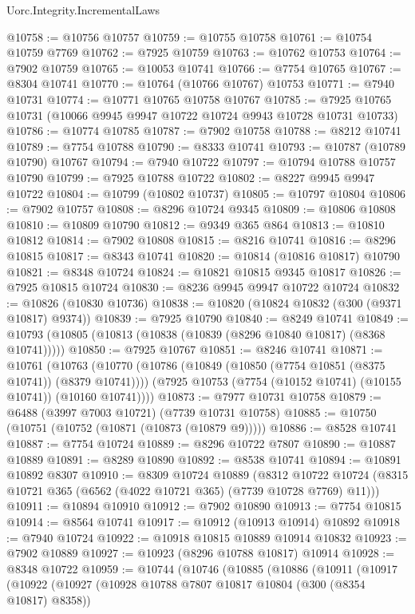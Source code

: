 \begin{lexlean}{Uorc.Integrity.IncrementalLaws}
\begin{coremodule}
@10758 := @10756 @10757
@10759 := @10755 @10758
@10761 := @10754 @10759 @7769
@10762 := @7925 @10759
@10763 := @10762 @10753
@10764 := @7902 @10759
@10765 := @10053 @10741
@10766 := @7754 @10765
@10767 := @8304 @10741
@10770 := @10764 (@10766 @10767) @10753
@10771 := @7940 @10731
@10774 := @10771 @10765 @10758 @10767
@10785 := @7925 @10765 @10731 (@10066 @9945 @9947 @10722 @10724 @9943 @10728 @10731 @10733)
@10786 := @10774 @10785
@10787 := @7902 @10758
@10788 := @8212 @10741
@10789 := @7754 @10788
@10790 := @8333 @10741
@10793 := @10787 (@10789 @10790) @10767
@10794 := @7940 @10722
@10797 := @10794 @10788 @10757 @10790
@10799 := @7925 @10788 @10722
@10802 := @8227 @9945 @9947 @10722
@10804 := @10799 (@10802 @10737)
@10805 := @10797 @10804
@10806 := @7902 @10757
@10808 := @8296 @10724 @9345
@10809 := @10806 @10808
@10810 := @10809 @10790
@10812 := @9349 @365 @864
@10813 := @10810 @10812
@10814 := @7902 @10808
@10815 := @8216 @10741
@10816 := @8296 @10815
@10817 := @8343 @10741
@10820 := @10814 (@10816 @10817) @10790
@10821 := @8348 @10724
@10824 := @10821 @10815 @9345 @10817
@10826 := @7925 @10815 @10724
@10830 := @8236 @9945 @9947 @10722 @10724
@10832 := @10826 (@10830 @10736)
@10838 := @10820 (@10824 @10832 (@300 (@9371 @10817) @9374))
@10839 := @7925 @10790
@10840 := @8249 @10741
@10849 := @10793 (@10805 (@10813 (@10838 (@10839 (@8296 @10840 @10817) (@8368 @10741)))))
@10850 := @7925 @10767
@10851 := @8246 @10741
@10871 := @10761
    (@10763
      (@10770
        (@10786 (@10849 (@10850 (@7754 @10851 (@8375 @10741)) (@8379 @10741))))
        (@7925 @10753 (@7754 (@10152 @10741) (@10155 @10741)) (@10160 @10741))))
@10873 := @7977 @10731 @10758
@10879 := @6488 (@3997 @7003 @10721) (@7739 @10731 @10758)
@10885 := @10750 (@10751 (@10752 (@10871 (@10873 (@10879 @9)))))
@10886 := @8528 @10741
@10887 := @7754 @10724
@10889 := @8296 @10722 @7807
@10890 := @10887 @10889
@10891 := @8289 @10890
@10892 := @8538 @10741
@10894 := @10891 @10892 @8307
@10910 := @8309
    @10724
    @10889
    (@8312 @10722 @10724 (@8315 @10721 @365 (@6562 (@4022 @10721 @365) (@7739 @10728 @7769) @11)))
@10911 := @10894 @10910
@10912 := @7902 @10890
@10913 := @7754 @10815
@10914 := @8564 @10741
@10917 := @10912 (@10913 @10914) @10892
@10918 := @7940 @10724
@10922 := @10918 @10815 @10889 @10914 @10832
@10923 := @7902 @10889
@10927 := @10923 (@8296 @10788 @10817) @10914
@10928 := @8348 @10722
@10959 := @10744
    (@10746
      (@10885
        (@10886
          (@10911
            (@10917
              (@10922
                (@10927
                  (@10928 @10788 @7807 @10817 @10804 (@300 (@8354 @10817) @8358))

\end{coremodule}
\end{lexlean}
